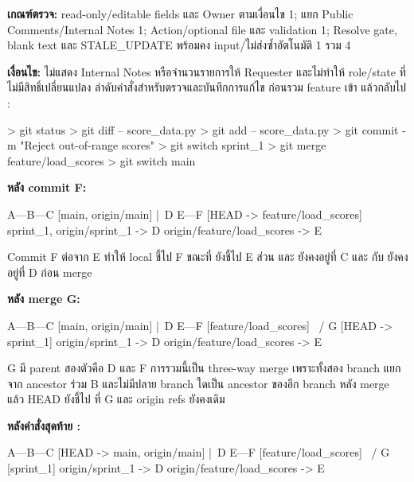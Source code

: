\textbf{เกณฑ์ตรวจ:} read-only/editable fields และ Owner ตามเงื่อนไข 1; แยก Public Comments/Internal Notes 1; Action/optional file และ validation 1; Resolve gate, blank text และ STALE\_UPDATE พร้อมคง input/ไม่ส่งซ้ำอัตโนมัติ 1 รวม 4\par
\textbf{เงื่อนไข:} ไม่แสดง Internal Notes หรือจำนวนรายการให้ Requester และไม่ทำให้ role/state ที่ไม่มีสิทธิ์เปลี่ยนแปลง
\newpage
{}
ลำดับคำสั่งสำหรับตรวจและบันทึกการแก้ไข ก่อนรวม feature เข้า  แล้วกลับไป :
\begin{gitpanel}
> git status
> git diff -- score_data.py
> git add -- score_data.py
> git commit -m "Reject out-of-range scores"
> git switch sprint_1
> git merge feature/load_scores
> git switch main
\end{gitpanel}
\textbf{หลัง commit F:}
\begin{gitpanel}
A---B---C [main, origin/main]
    |\
    D E---F [HEAD -> feature/load_scores]
sprint_1, origin/sprint_1 -> D
origin/feature/load_scores -> E
\end{gitpanel}
Commit F ต่อจาก E ทำให้ local  ชี้ไป F ขณะที่  ยังชี้ไป E ส่วน  และ  ยังคงอยู่ที่ C และ  กับ  ยังคงอยู่ที่ D ก่อน merge\par\smallskip\noindent
\textbf{หลัง merge G:}\par\smallskip\noindent
\begin{gitpanel}
A---B---C [main, origin/main]
    |\
    D E---F [feature/load_scores]
     \   /
      \-G [HEAD -> sprint_1]
origin/sprint_1 -> D
origin/feature/load_scores -> E
\end{gitpanel}
G มี parent สองตัวคือ D และ F การรวมนี้เป็น three-way merge เพราะทั้งสอง branch แยกจาก ancestor ร่วม B และไม่มีปลาย branch ใดเป็น ancestor ของอีก branch หลัง merge แล้ว HEAD ยังชี้ไป  ที่ G และ origin refs ยังคงเดิม\par\smallskip\noindent
\textbf{หลังคำสั่งสุดท้าย :}\par\smallskip\noindent
\begin{gitpanel}
A---B---C [HEAD -> main, origin/main]
    |\
    D E---F [feature/load_scores]
     \   /
      \-G [sprint_1]
origin/sprint_1 -> D
origin/feature/load_scores -> E
\end{gitpanel}
